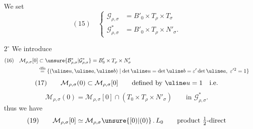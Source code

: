 We set
\[
(15)\quad\left\{\begin{aligned}
 \mathcal{G}_{\rho,\sigma}&=B'_0\times T_\rho\times T_\sigma\\[4pt]
 \mathcal{G}_{\rho,\sigma}^{*}&=B'_0\times T_\rho\times N'_\sigma.
\end{aligned}\right.
\]




\textcircled{$2^\circ$} We introduce
\[
\begin{aligned}
(16)\quad \mathcal M_{\rho,\sigma}[0]
 &\subset \unsure{\mathcal B_{\rho,\sigma}^{*}|\mathcal G_{\rho,\sigma}^{*}}
   =B'_0\times T_\rho\times N'_\sigma\\
 &\mathrel{\mathop{=}\limits^{\mathrm{dfn}}}
 \{(\uline u,\uline a,\uline b)\mid
   \det\uline u=\det\uline b=\varepsilon'\det\uline a,\
   \varepsilon'{}^2=1\}
\end{aligned}
\]
\[
(17)\qquad \mathcal M_{\rho,\sigma}(0)\subset\mathcal M_{\rho,\sigma}[0]
 \qquad\text{defined by }\uline u=1\quad\text{i.e.}
\]
\[
 \mathcal M_{\rho,\sigma}(0)=\mathcal M_{\rho,\sigma}[0]
   \cap(T_0\times T_\rho\times N'_\sigma)
 \qquad\text{in }\mathcal G_{\rho,\sigma}^{*}.
\]
thus we have
\[
(19)\qquad \mathcal M_{\rho,\sigma}[0]\simeq
  \mathcal M_{\rho,\sigma}\unsure{[0)|(0)}\, .\, L_0
 \qquad\text{product }\tfrac12\text{-direct}
\]

